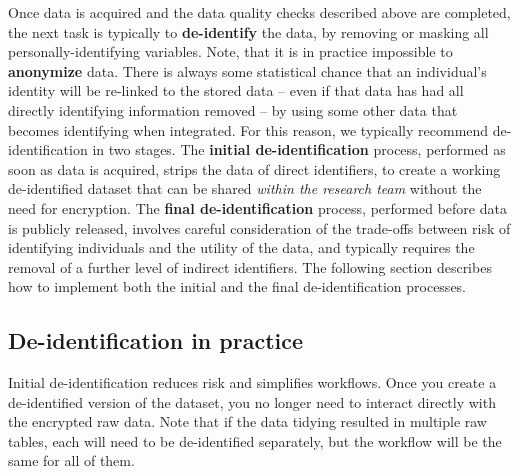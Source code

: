 Once data is acquired and the data quality checks described above are completed,
the next task is typically to \textbf{de-identify} the data,
by removing or masking all personally-identifying variables.
Note, that it is in practice impossible to \textbf{anonymize} data.
There is always some statistical chance that an individual's identity
will be re-linked to the stored data
-- even if that data has had all directly identifying information removed --
by using some other data that becomes identifying when integrated.
For this reason, we typically recommend de-identification in two stages.
The \textbf{initial de-identification} process, 
performed as soon as data is acquired, strips the data of direct identifiers,
to create a working de-identified dataset that
can be shared \textit{within the research team} without the need for encryption.
The \textbf{final de-identification} process,
performed before data is publicly released, involves
careful consideration of the trade-offs between
risk of identifying individuals and the utility of the data,
and typically requires the removal of a further level of indirect identifiers.
The following section describes how to implement 
both the initial and the final de-identification processes.


\subsection{De-identification in practice}

Initial de-identification reduces risk and simplifies workflows.
Once you create a de-identified version of the dataset,
you no longer need to interact directly with the encrypted raw data.
Note that if the data tidying resulted in multiple raw tables,
each will need to be de-identified separately, but
the workflow will be the same for all of them.

